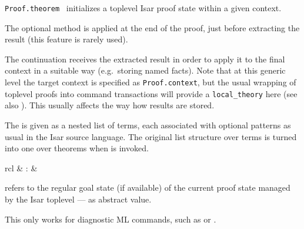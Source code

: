 \begin{isabellebody}
\begin{isamarkuptext}
\begin{description}
  \item \verb|Proof.theorem|~
  initializes a toplevel Isar proof state within a given context.

  The optional  method is applied at the end of
  the proof, just before extracting the result (this feature is rarely
  used).

  The  continuation receives the extracted result
  in order to apply it to the final context in a suitable way (e.g.\
  storing named facts).  Note that at this generic level the target
  context is specified as \verb|Proof.context|, but the usual
  wrapping of toplevel proofs into command transactions will provide a
  \verb|local_theory| here (see also \chref{ch:local-theory}).
  This usually affects the way how results are stored.

  The  is given as a nested list of terms, each
  associated with optional \hyperlink{keyword.is}{\mbox{}} patterns as usual in the
  Isar source language.  The original list structure over terms is
  turned into one over theorems when  is invoked.

  \end{description}%
\end{isamarkuptext}%
\isamarkuptrue%
%
\endisatagmlref
{\isafoldmlref}%
%
\isadelimmlref
%
\endisadelimmlref
%
\isadelimmlantiq
%
\endisadelimmlantiq
%
\isatagmlantiq
%
\begin{isamarkuptext}%
\begin{matharray}{rcl}
  \hypertarget{ML antiquotation.Isar.goal}{\hyperlink{ML antiquotation.Isar.goal}{\mbox{}}} & : &  \\
  \end{matharray}

  \begin{description}

  \item {} refers to the regular goal state (if
  available) of the current proof state managed by the Isar toplevel
  --- as abstract value.

  This only works for diagnostic ML commands, such as \hyperlink{command.ML-val}{\mbox{}} or \hyperlink{command.ML-command}{\mbox{}}.


\end{description}
\end{isamarkuptext}
\end{isabellebody}
